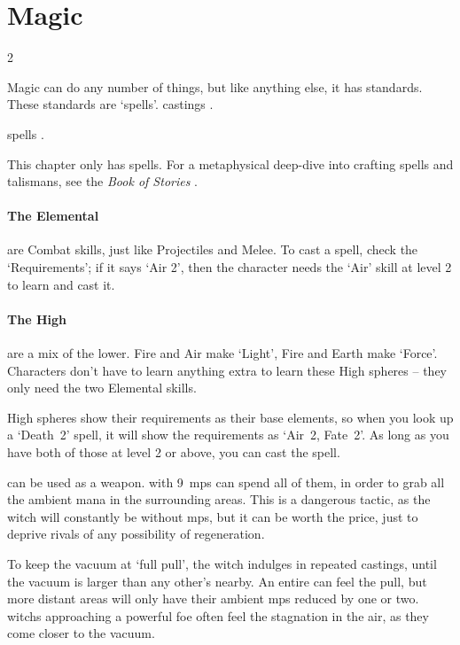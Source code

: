 \chapter[Chamber of Magic]{Magic}
\label{spellsChapter}
\toggletrue{examplecharacter}

\begin{multicols}{2}

\noindent
Magic can do any number of things, but like anything else, it has standards.
These standards are `spells'.
\Glspl{casting}
.

\Glspl{spell}
.

This chapter only has \glspl{spell}.  For a metaphysical deep-dive into
crafting \glspl{spell} and \glspl{talisman}, see the \textit{Book of Stories}%
\iftoggle{stories}{, \autoref{witchcraft}}{}.

\subsubsection{The Elemental }
are Combat \glspl{skill}, just like Projectiles and Melee.
To cast a spell, check the `Requirements'; if it says `Air 2', then the character needs the `Air' \gls{skill} at level 2 to learn and cast it.

\subsubsection{The High }
are a mix of the lower.
Fire and Air make `Light', Fire and Earth make `Force'.
Characters don't have to learn anything extra to learn these High \glspl{sphere} -- they only need the two Elemental \glspl{skill}.

High \glspl{sphere} show their requirements as their base elements, so when you look up a `Death~2' spell, it will show the requirements as `Air~2, Fate~2'.
As long as you have both of those at level 2 or above, you can cast the spell.

can be used as a weapon.
 with 9~\glspl{mp} can spend all of them, in order to grab all the ambient mana in the surrounding \glspl{area}.
This is a dangerous tactic, as the \gls{witch} will constantly be without \glspl{mp}, but it can be worth the price, just to deprive rivals of any possibility of regeneration.

To keep the vacuum at `full pull', the \gls{witch} indulges in repeated \glspl{casting}, until the vacuum is larger than any other's nearby.
An entire  can feel the pull, but more distant \glspl{area} will only have their ambient \glspl{mp} reduced by one or two.
\Glspl{witch} approaching a powerful foe often feel the stagnation in the air, as they come closer to the vacuum.

\end{multicols}

